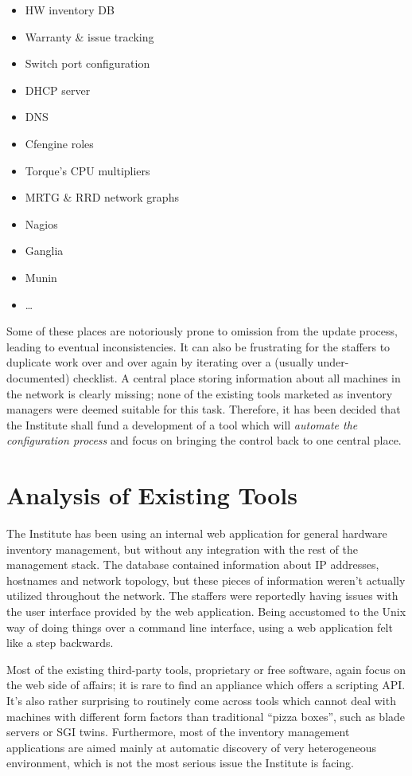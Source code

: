 \documentclass[a4paper]{jpconf}
\begin{document}
\begin{itemize}
    \item HW inventory DB
    \item Warranty \& issue tracking
    \item Switch port configuration
    \item DHCP server
    \item DNS
    \item Cfengine roles
    \item Torque's CPU multipliers
    \item MRTG \& RRD network graphs
    \item Nagios
    \item Ganglia
    \item Munin
    \item \ldots
\end{itemize}

Some of these places are notoriously prone to omission from the update process, leading to eventual inconsistencies.  It can also be
frustrating for the staffers to duplicate work over and over again by iterating over a (usually under-documented) checklist.  A central
place storing information about all machines in the network is clearly missing; none of the existing tools marketed as inventory
managers were deemed suitable for this task.  Therefore, it has been decided that the Institute shall fund a development of a tool
which will {\em automate the configuration process} and focus on bringing the control back to one central place.

\section{Analysis of Existing Tools}

The Institute has been using an internal web application for general hardware inventory management, but without any integration with
the rest of the management stack.  The database contained information about IP addresses, hostnames and network topology, but these
pieces of information weren't actually utilized throughout the network.  The staffers were reportedly having issues with the user
interface provided by the web application.  Being accustomed to the Unix way of doing things over a command line interface, using a web
application felt like a step backwards.

Most of the existing third-party tools, proprietary or free software, again focus on the web side of affairs; it is rare to find an
appliance which offers a scripting API.  It's also rather surprising to routinely come across tools which cannot deal with machines
with different form factors than traditional ``pizza boxes'', such as blade servers or SGI twins.  Furthermore, most of the inventory
management applications are aimed mainly at automatic discovery of very heterogeneous environment, which is not the most serious issue
the Institute is facing.
\end{document}
